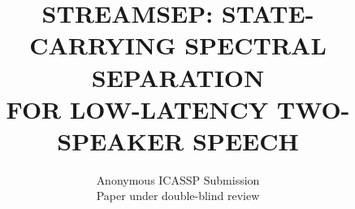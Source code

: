 \usepackage[letterpaper,top=0.72in,bottom=0.75in,left=0.72in,right=0.72in,
            columnsep=0.24in]{geometry}
\usepackage[T1]{fontenc}
\usepackage{microtype}
\usepackage{amsmath}
\usepackage{booktabs}
\usepackage{graphicx}
\usepackage{cite}
\usepackage{xcolor}
\usepackage{url}
\usepackage{flushend}

\setlength{\parindent}{1em}
\setlength{\parskip}{0pt}
\setlength{\textfloatsep}{7pt plus 2pt minus 2pt}
\setlength{\floatsep}{6pt plus 2pt minus 2pt}
\setlength{\intextsep}{6pt plus 2pt minus 2pt}
\setlength{\abovecaptionskip}{3pt}
\setlength{\belowcaptionskip}{-1pt}
\pagestyle{empty}

\makeatletter
\renewcommand\section{\@startsection{section}{1}{\z@}%
  {1.5ex plus .4ex minus .2ex}{.7ex plus .2ex}%
  {\normalfont\normalsize\bfseries\centering}}
\renewcommand\subsection{\@startsection{subsection}{2}{\z@}%
  {1.2ex plus .3ex minus .2ex}{.4ex plus .1ex}%
  {\normalfont\normalsize\bfseries}}
\renewcommand\thefootnote{\fnsymbol{footnote}}
\makeatother

\newcommand{\model}{\textsc{StreamSep}}
\newcommand{\R}{\mathbb{R}}
\newcommand{\E}{\mathbb{E}}
\newcommand{\norm}[1]{\left\lVert #1\right\rVert_2}
\newcommand{\sisdr}{\text{SI-SDR}}
\newcommand{\ms}{\,\mathrm{ms}}

\title{\vspace{-0.35in}\bfseries\MakeUppercase{StreamSep: State-Carrying Spectral Separation\\
for Low-Latency Two-Speaker Speech}}
\author{\normalsize Anonymous ICASSP Submission\\[-1pt]
        \small Paper under double-blind review}
\date{}
